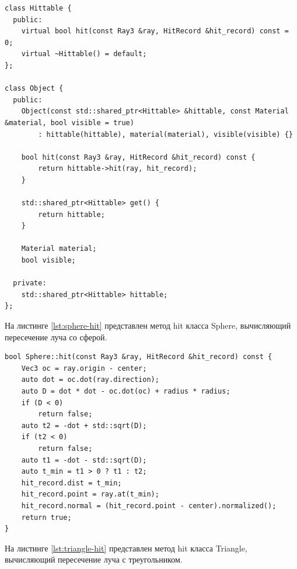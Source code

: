 \begin{lstlisting}[caption={Классы Hittable и Object}, label={lst:object}]
class Hittable {
  public:
    virtual bool hit(const Ray3 &ray, HitRecord &hit_record) const = 0;
    virtual ~Hittable() = default;
};

class Object {
  public:
    Object(const std::shared_ptr<Hittable> &hittable, const Material &material, bool visible = true)
        : hittable(hittable), material(material), visible(visible) {}

    bool hit(const Ray3 &ray, HitRecord &hit_record) const {
        return hittable->hit(ray, hit_record);
    }

    std::shared_ptr<Hittable> get() {
        return hittable;
    }

    Material material;
    bool visible;

  private:
    std::shared_ptr<Hittable> hittable;
};
\end{lstlisting}

На листинге \ref{lst:sphere-hit} представлен метод hit класса Sphere, вычисляющий пересечение луча со сферой.

\begin{lstlisting}[caption={Метод hit класса Sphere}, label={lst:sphere-hit}]
bool Sphere::hit(const Ray3 &ray, HitRecord &hit_record) const {
    Vec3 oc = ray.origin - center;
    auto dot = oc.dot(ray.direction);
    auto D = dot * dot - oc.dot(oc) + radius * radius;
    if (D < 0)
        return false;
    auto t2 = -dot + std::sqrt(D);
    if (t2 < 0)
        return false;
    auto t1 = -dot - std::sqrt(D);
    auto t_min = t1 > 0 ? t1 : t2;
    hit_record.dist = t_min;
    hit_record.point = ray.at(t_min);
    hit_record.normal = (hit_record.point - center).normalized();
    return true;
}
\end{lstlisting}

На листинге \ref{lst:triangle-hit} представлен метод hit класса Triangle, вычисляющий пересечение луча с треугольником.

